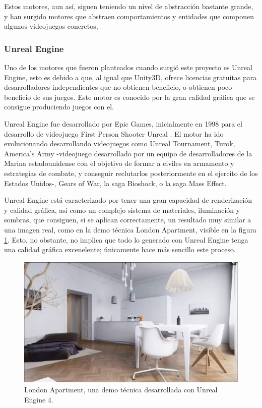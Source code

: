 Estos motores, aun así, siguen teniendo un nivel de abstracción bastante grande, y han surgido motores que abstraen comportamientos y entidades que componen algunos videojuegos concretos, 

\subsubsection{Unreal Engine}

Uno de los motores que fueron planteados cuando surgió este proyecto es Unreal Engine, esto es debido a que, al igual que Unity3D, ofrece licencias gratuitas para desarrolladores independientes que no obtienen beneficio, o obtienen poco beneficio de sus juegos. Este motor es conocido por la gran calidad gráfica que se consigue produciendo juegos con el.

Unreal Engine fue desarrollado por Epic Games, inicialmente en 1998 para el desarrollo de videojuego First Person Shooter Unreal \cite{unrealengine}. El motor ha ido evolucionando desarrollando videojuegos como Unreal Tournament, Turok, America's Army -videojuego desarrollado por un equipo de desarrolladores de la Marina estadounidense con el objetivo de formar a civiles en armamento y estrategias de combate, y conseguir reclutarlos posteriormente en el ejercito de los Estados Unidos-, Gears of War, la saga Bioshock, o la saga Mass Effect. 

Unreal Engine está caracterizado por tener una gran capacidad de renderización y calidad gráfica, así como un complejo sistema de materiales, iluminación y sombras, que consiguen, si se aplican correctamente, un resultado muy similar a una imagen real, como en la demo técnica London Apartment, visible en la figura \ref{londonapartment}. Esto, no obstante, no implica que todo lo generado con Unreal Engine tenga una calidad gráfica excenelente; únicamente hace más sencillo este proceso.

\begin{figure}[htb]
	\centerline{\includegraphics[height=2.5in]{figures/london-apartment.jpg}}
	\caption[Unreal Engine 4 - London Apartment]{London Apartment, una demo técnica desarrollada con Unreal Engine 4.}
	\label{londonapartment}
\end{figure}

